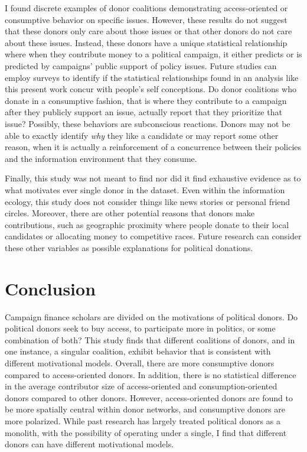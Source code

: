 \documentclass[12pt,]{article}
\begin{document}
I found discrete examples of donor coalitions demonstrating
access-oriented or consumptive behavior on specific issues. However,
these results do not suggest that these donors only care about those
issues or that other donors do not care about these issues. Instead,
these donors have a unique statistical relationship where when they
contribute money to a political campaign, it either predicts or is
predicted by campaigns' public support of policy issues. Future studies
can employ surveys to identify if the statistical relationships found in
an analysis like this present work concur with people's self
conceptions. Do donor coalitions who donate in a consumptive fashion,
that is where they contribute to a campaign after they publicly support
an issue, actually report that they prioritize that issue? Possibly,
these behaviors are subconscious reactions. Donors may not be able to
exactly identify \emph{why} they like a candidate or may report some
other reason, when it is actually a reinforcement of a concurrence
between their policies and the information environment that they
consume.

Finally, this study was not meant to find nor did it find exhaustive
evidence as to what motivates ever single donor in the dataset. Even
within the information ecology, this study does not consider things like
news stories or personal friend circles. Moreover, there are other
potential reasons that donors make contributions, such as geographic
proximity where people donate to their local candidates or allocating
money to competitive races. Future research can consider these other
variables as possible explanations for political donations.

\hypertarget{conclusion}{%
\section{Conclusion}\label{conclusion}}

Campaign finance scholars are divided on the motivations of political
donors. Do political donors seek to buy access, to participate more in
politics, or some combination of both? This study finds that different
coalitions of donors, and in one instance, a singular coalition, exhibit
behavior that is consistent with different motivational models. Overall,
there are more consumptive donors compared to access-oriented donors. In
addition, there is no statistical difference in the average contributor
size of access-oriented and consumption-oriented donors compared to
other donors. However, access-oriented donors are found to be more
spatially central within donor networks, and consumptive donors are more
polarized. While past research has largely treated political donors as a
monolith, with the possibility of operating under a single, I find that
different donors can have different motivational models.
\end{document}
